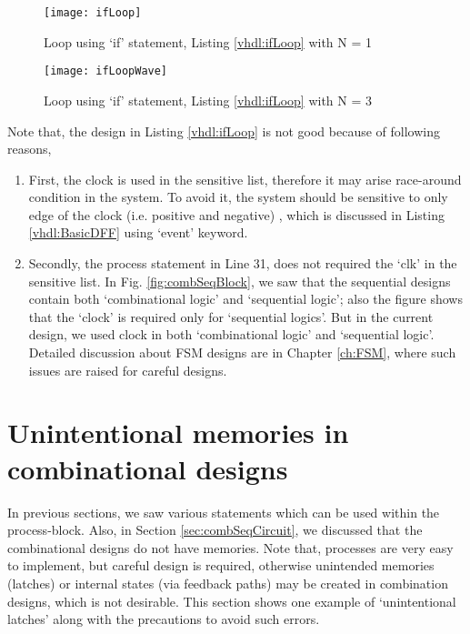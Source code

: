 
\begin{figure}[!h]
	\centering
	\texttt{[image: ifLoop]}
	\caption{Loop using `if' statement, Listing \ref{vhdl:ifLoop} with N = 1}
	\label{fig:ifLoop}
\end{figure}

\begin{figure}[!h]
	\centering
	\texttt{[image: ifLoopWave]}
	\caption{Loop using `if' statement, Listing \ref{vhdl:ifLoop} with N = 3}
	\label{fig:ifLoopWave}
\end{figure}

\begin{noNumBox}
	Note that, the design in Listing \ref{vhdl:ifLoop} is not good because of following reasons,
	\begin{enumerate}		
		\item First, the clock is used in the sensitive list, therefore it may arise race-around condition in the system. To avoid it, the system should be sensitive to only edge of the clock (i.e. positive and negative) , which is discussed in Listing \ref{vhdl:BasicDFF} using `event' keyword.
		
		\item Secondly, the process statement in Line 31, does not required the `clk' in the sensitive list. In Fig. \ref{fig:combSeqBlock}, we saw that the sequential designs contain both `combinational logic' and `sequential logic'; also the figure shows that the `clock' is required  only for `sequential logics'. But in the current design, we used clock in both `combinational logic' and `sequential logic'. Detailed discussion about FSM designs are in Chapter \ref{ch:FSM}, where such issues are raised for careful designs.  
	\end{enumerate}
	
\end{noNumBox}

\section{Unintentional memories in combinational designs}
In previous sections, we saw various statements which can be used within the process-block. Also, in Section \ref{sec:combSeqCircuit}, we discussed that the combinational designs do not have memories. Note that, processes are very easy to implement, but careful design is required, otherwise unintended memories (latches) or internal states (via feedback paths) may be created in combination designs, which is not desirable. This section shows one example of `unintentional latches' along with the precautions to avoid such errors. 

